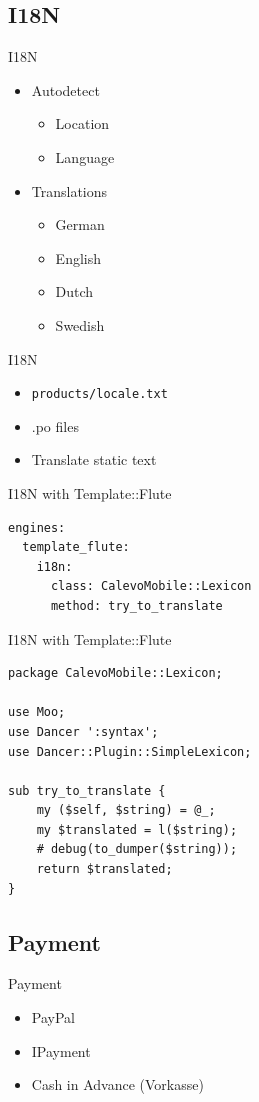 \subsection{I18N}
\begin{frame}{I18N}
\begin{itemize}
\item Autodetect
\begin{itemize}
\item{Location}
\item{Language}
\end{itemize}
\item Translations
\begin{itemize}
\item German
\item English
\item Dutch
\item Swedish
\end{itemize}
\end{itemize}
\end{frame}

\begin{frame}[fragile]{I18N}
\begin{itemize}
\item \verb|products/locale.txt|
\item .po files
\item Translate static text
\end{itemize}
\end{frame}

\begin{frame}[fragile]{I18N with Template::Flute}
\begin{lstlisting}
engines:
  template_flute:
    i18n:
      class: CalevoMobile::Lexicon
      method: try_to_translate
\end{lstlisting}
\end{frame}

\begin{frame}[fragile]{I18N with Template::Flute}
\begin{lstlisting}
package CalevoMobile::Lexicon;

use Moo;
use Dancer ':syntax';
use Dancer::Plugin::SimpleLexicon;

sub try_to_translate {
    my ($self, $string) = @_;
    my $translated = l($string);
    # debug(to_dumper($string));
    return $translated;
}
\end{lstlisting}
\end{frame}

\subsection{Payment}
\begin{frame}{Payment}
\begin{itemize}
\item PayPal
\item IPayment
\item Cash in Advance (Vorkasse)
\end{itemize}
\end{frame}

